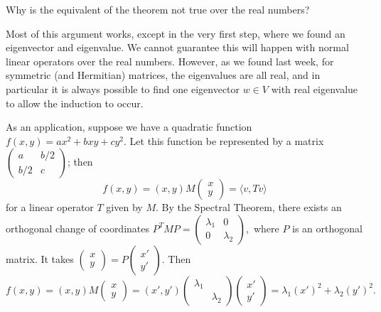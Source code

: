 \begin{question}
Why is the equivalent of the theorem not true over the real numbers? 
\end{question}
\begin{ans}
Most of this argument works, except in the very first step, where we found an eigenvector and eigenvalue. We cannot guarantee this will happen with normal linear operators over the real numbers. However, as we found last week, for symmetric (and Hermitian) matrices, the eigenvalues are all real, and in particular it is always possible to find one eigenvector $w \in V$ with real eigenvalue to allow the induction to occur.
\end{ans}


As an application, suppose we have a quadratic function $f(x, y) = ax^2 + bxy + cy^2.$ Let this function be represented by a matrix 
$
\begin{pmatrix}
a & b/2 \\
b/2 & c
\end{pmatrix}$; then \[
f(x, y) = (x, y) M \begin{pmatrix}
x \\ y
\end{pmatrix} = \langle v, Tv \rangle
\]
for a linear operator $T$ given by $M.$ By the Spectral Theorem, there exists an orthogonal change of coordinates $P^TMP = \begin{pmatrix}
\lambda_1 & 0 \\ 0 & \lambda_2
\end{pmatrix},$ where $P$ is an orthogonal matrix. It takes $\begin{pmatrix}
x \\ y
\end{pmatrix} = P\begin{pmatrix}
x' \\ y'
\end{pmatrix}$. Then 
\[
f(x, y) = (x, y) M \begin{pmatrix}
x \\ y
\end{pmatrix} = (x', y') \begin{pmatrix}
\lambda_1 & \\ & \lambda_2
\end{pmatrix}\begin{pmatrix}
x'\\ y'
\end{pmatrix} = \lambda_1(x')^2 + \lambda_2(y')^2.
\]

